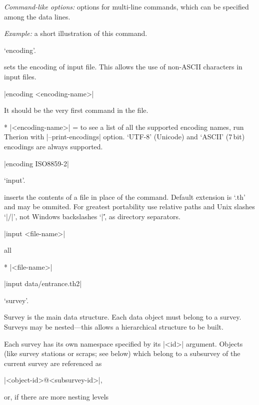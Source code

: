 {\it Command-like options:} options for multi-line commands, which can be specified 
   among the data lines.

{\it Example:} a short illustration of this command.




\subsubchapter `encoding'.

\description
  sets the encoding of input file. This allows the use of non-ASCII characters
  in input files.
\enddescription

\syntax
  |encoding <encoding-name>|
\endsyntax

\context
  It should be the very first command in the file.
\endcontext

\arguments
* |<encoding-name>| = to see a list of all the supported encoding names, run Therion with 
  |--print-encodings| option. `UTF-8' (Unicode) and `ASCII' (7\,bit) encodings 
  are always supported.
\endarguments

\example
  |encoding ISO8859-2|
\endexample



\subsubchapter `input'.

\description
  inserts the contents of a file in place of 
  the command. Default extension is `.th' and may be ommited. For greatest 
  portability use relative paths and Unix slashes `|/|', not Windows 
  backslashes `|\|', as 
  directory separators.
\enddescription

\syntax
  |input <file-name>|
\endsyntax

\context
  all
\endcontext

\arguments
*  |<file-name>|
\endarguments

\example
  |input data/entrance.th2|
\endexample



\subsubchapter `survey'.

\description
  Survey is the main data structure. Each data object must belong to a 
  survey. Surveys may be nested---this allows a hierarchical structure 
  to be built. 

  Each survey has its own namespace specified by its |<id>| argument. Objects 
  (like survey stations or scraps; see below) which belong to a subsurvey of 
  the current survey are referenced as
  
  |<object-id>@<subsurvey-id>|,
  
  or, if there are more nesting levels
  
